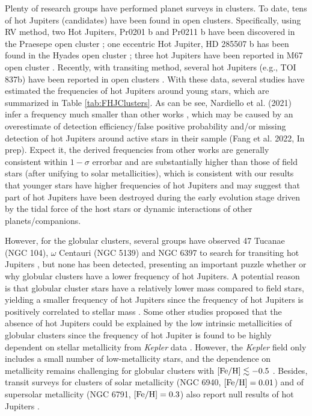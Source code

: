 \documentclass[twocolumn]{pnas-new}
\begin{document}
Plenty of research groups have performed planet surveys in clusters.
To date, tens of hot Jupiters (candidates) have been found in open clusters.
Specifically, using RV method, two Hot Jupiters, Pr0201 b and Pr0211 b have been discovered in the Praesepe open cluster \citep{2012ApJ...756L..33Q}; one eccentric Hot Jupiter, HD 285507 b has been found in the Hyades open cluster \citep{2014ApJ...787...27Q}; three hot Jupiters have been reported in M67 open cluster \citep{2014A&A...561L...9B,2016A&A...592L...1B,2017A&A...603A..85B}.
Recently, with transiting method, several hot Jupiters (e.g., TOI 837b) have been reported in open clusters \citep[e.g., IC 2602, NGC752, NGC 7789; Fang et al. 2022, In prep.,][]{2021MNRAS.505.3767N}.
With these data, several studies have estimated the frequencies of hot Jupiters around young stars, which are summarized in Table \ref{tab:FHJClusters}.
As can be see, Nardiello et al. (2021) infer a frequency much smaller than other works \citep{2021MNRAS.505.3767N}, which may be caused by an overestimate of detection efficiency/false positive probability and/or missing detection of hot Jupiters around active stars in their sample (Fang et al. 2022, In prep).
Expect it, the derived frequencies from other works are generally consistent within $1-\sigma$ errorbar and are substantially higher than those of field stars (after unifying to solar metallicities), which is consistent with our results that younger stars have higher frequencies of hot Jupiters and may suggest that part of hot Jupiters have been destroyed during the early evolution stage driven by the tidal force of the host stars or dynamic interactions of other planets/companions.

However,  for the globular clusters, several groups have observed 47 Tucanae (NGC 104), $\omega$ Centauri (NGC 5139) and NGC 6397 to search for transiting hot Jupiters \citep{2000ApJ...545L..47G,2008ApJ...674.1117W,2012A&A...541A.144N,2017AJ....153..187M}, but none has been detected, presenting an important puzzle whether or why globular clusters have a lower frequency of hot Jupiters.
A potential reason is that globular cluster stars have a relatively lower mass compared to field stars, yielding a smaller frequency of hot Jupiters since the frequency of hot Jupiters is positively correlated to stellar mass \citep{2010PASP..122..905J}.
Some other studies proposed that the absence of hot Jupiters could be explained by the low intrinsic metallicities of globular clusters \citep[e.g., NGC GC and NGC6397 with metallicities of about -1 to -2;][]{2008ApJ...674.1117W,2012A&A...541A.144N} since the frequency of hot Jupiter is found to be highly dependent on stellar metallicity from {\it Kepler} data \citep[e.g.,][]{2017ApJ...838...25G}. 
However, the {\it Kepler} field only includes a small number of low-metallicity stars, and the dependence on metallicity remains challenging for globular clusters with $\rm [Fe/H] \lesssim -0.5$ \citep[e.g.,][]{2017AJ....153..187M}.
Besides, transit surveys for clusters of solar metallicity (NGC 6940, $\rm [Fe/H] = 0.01$) and of supersolar metallicity (NGC 6791, $\rm [Fe/H] = 0.3$) also report null results of hot Jupiters \citep{2003AJ....125.1397C,2009AJ....137.4949B}.
\end{document}
